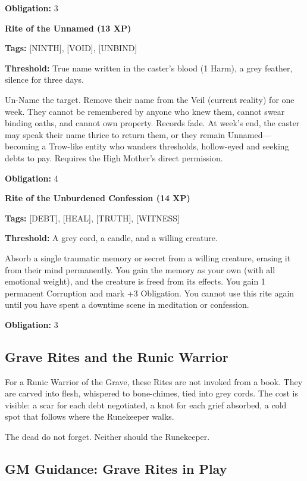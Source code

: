 \textbf{Obligation:} 3

\vspace{0.5em}

\textbf{Rite of the Unnamed (13 XP)}

\textbf{Tags:} [NINTH], [VOID], [UNBIND]

\textbf{Threshold:} True name written in the caster's blood (1 Harm), a grey feather, silence for three days.

Un-Name the target. Remove their name from the Veil (current reality) for one week. They cannot be remembered by anyone who knew them, cannot swear binding oaths, and cannot own property. Records fade. At week's end, the caster may speak their name thrice to return them, or they remain Unnamed—becoming a Trow-like entity who wanders thresholds, hollow-eyed and seeking debts to pay. Requires the High Mother's direct permission.

\textbf{Obligation:} 4

\vspace{0.5em}

\textbf{Rite of the Unburdened Confession (14 XP)}

\textbf{Tags:} [DEBT], [HEAL], [TRUTH], [WITNESS]

\textbf{Threshold:} A grey cord, a candle, and a willing creature.

Absorb a single traumatic memory or secret from a willing creature, erasing it from their mind permanently. You gain the memory as your own (with all emotional weight), and the creature is freed from its effects. You gain 1 permanent Corruption and mark +3 Obligation. You cannot use this rite again until you have spent a downtime scene in meditation or confession.

\textbf{Obligation:} 3

\subsection{Grave Rites and the Runic Warrior}

For a Runic Warrior of the Grave, these Rites are not invoked from a book. They are carved into flesh, whispered to bone-chimes, tied into grey cords. The cost is visible: a scar for each debt negotiated, a knot for each grief absorbed, a cold spot that follows where the Runekeeper walks.

The dead do not forget. Neither should the Runekeeper.

\subsection{GM Guidance: Grave Rites in Play}

